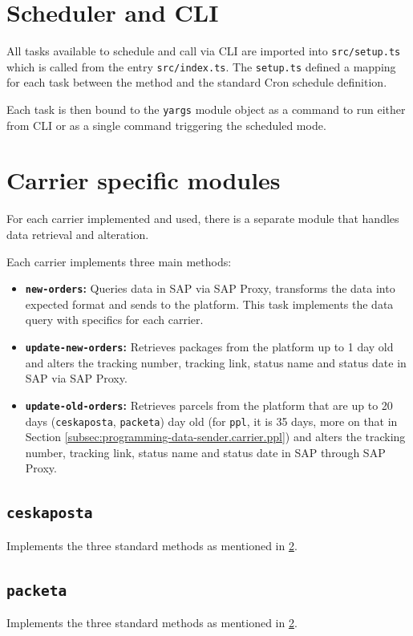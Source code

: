 \section{Scheduler and \ac{CLI}}
All tasks available to schedule and call via \ac{CLI} are imported into \texttt{src/setup.ts} which is called from the entry \texttt{src/index.ts}.
The \texttt{setup.ts} defined a mapping for each task between the method and the standard Cron schedule definition.

Each task is then bound to the \texttt{yargs} module object as a command to run either from \ac{CLI} or as a single command triggering the scheduled mode.

\section{Carrier specific modules}
\label{subsec:programming-data-sender.carrier}

For each carrier implemented and used, there is a separate module that handles data retrieval and alteration.

Each carrier implements three main methods: 
\begin{itemize}
    \item \textbf{\texttt{new-orders}:} Queries data in SAP via SAP Proxy, transforms the data into expected format and sends to the platform. This task implements the data query with specifics for each carrier. 
    \item \textbf{\texttt{update-new-orders}:} Retrieves packages from the platform up to 1 day old and alters the tracking number, tracking link, status name and status date in SAP via SAP Proxy.
    \item \textbf{\texttt{update-old-orders}:} Retrieves parcels from the platform that are up to 20 days (\texttt{ceskaposta}, \texttt{packeta}) day old (for \texttt{ppl}, it is 35 days, more on that in Section \ref{subsec:programming-data-sender.carrier.ppl}) and alters the tracking number, tracking link, status name and status date in SAP through SAP Proxy.
\end{itemize}
\subsection{\texttt{ceskaposta}}
Implements the three standard methods as mentioned in \ref{subsec:programming-data-sender.carrier}.
\subsection{\texttt{packeta}}
Implements the three standard methods as mentioned in \ref{subsec:programming-data-sender.carrier}.
